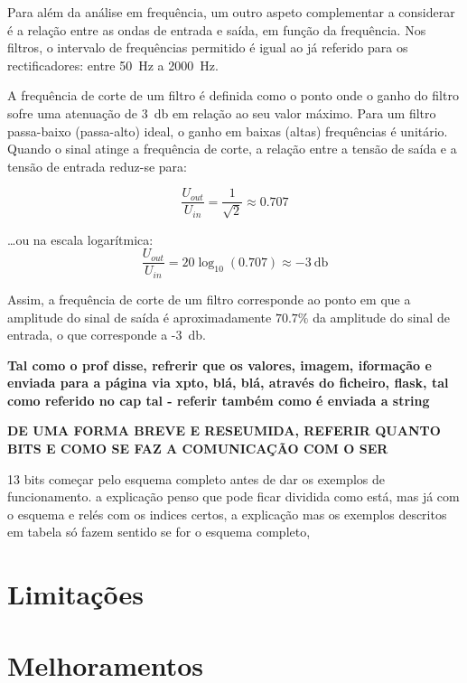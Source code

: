 	Para além da análise em frequência, um outro aspeto complementar a considerar é a relação entre as ondas de entrada e saída, em função da frequência. Nos filtros, o intervalo de frequências permitido é igual ao já referido para os rectificadores: entre \SI{50}{\hertz} a \SI{2000}{\hertz}. 
	
	A frequência de corte de um filtro é definida como o ponto onde o ganho do filtro sofre uma atenuação de \SI{3}{\decibel} em relação ao seu valor máximo. 	Para um filtro passa-baixo (passa-alto) ideal, o ganho em baixas (altas) frequências é unitário. Quando o sinal atinge a frequência de corte, a relação entre a tensão de saída e a tensão de entrada reduz-se para:  
	
	\begin{equation} \label{eq:relacaoGanho}
		\frac{U_{out}}{U_{in}} = \frac{1}{\sqrt{2}} \approx 0.707
	\end{equation}
	
	\ldots ou na escala logarítmica:  
\begin{equation} \label{eq:relacaoGanhodB}
	\frac{U_{out}}{U_{in}} = 20 \log_{10} (0.707) \approx -\SI{3}{\decibel}	
\end{equation}
	
Assim, a frequência de corte de um filtro corresponde ao ponto em que a amplitude do sinal de saída é aproximadamente $70.7\%$ da amplitude do sinal de entrada, o que corresponde a -\SI{3}{\decibel}. 


\textbf{Tal como o prof disse, refrerir que os valores, imagem, iformação e enviada para a página via xpto, blá, blá, através do ficheiro, flask, tal como referido no cap tal - referir também como é enviada a string}

\textbf{DE UMA FORMA BREVE E RESEUMIDA, REFERIR QUANTO BITS E COMO SE FAZ A COMUNICAÇÃO COM O SER}

13 bits começar pelo esquema completo antes de dar os exemplos de funcionamento. a explicação penso que pode ficar dividida como está, mas já com o esquema e relés com os indices certos, a explicação mas os exemplos descritos em tabela só fazem sentido se for o esquema completo,


\section{Limitações}
\section{Melhoramentos}



